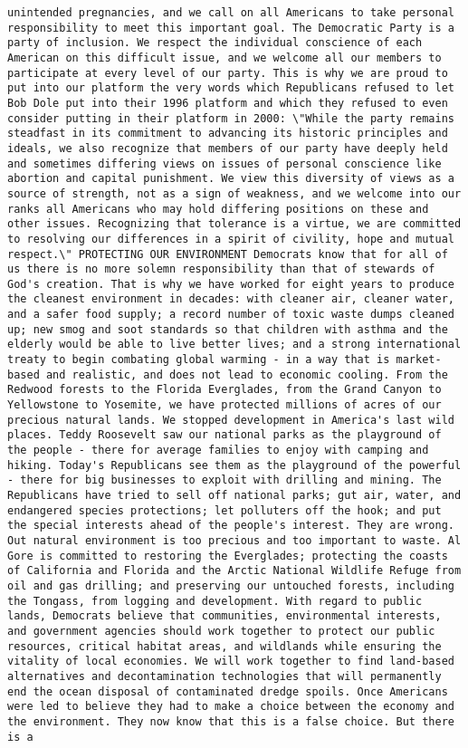 \documentclass[
]{article}
\begin{document}
\begin{verbatim}
unintended pregnancies, and we call on all Americans to take personal responsibility to meet this important goal. The Democratic Party is a party of inclusion. We respect the individual conscience of each American on this difficult issue, and we welcome all our members to participate at every level of our party. This is why we are proud to put into our platform the very words which Republicans refused to let Bob Dole put into their 1996 platform and which they refused to even consider putting in their platform in 2000: \"While the party remains steadfast in its commitment to advancing its historic principles and ideals, we also recognize that members of our party have deeply held and sometimes differing views on issues of personal conscience like abortion and capital punishment. We view this diversity of views as a source of strength, not as a sign of weakness, and we welcome into our ranks all Americans who may hold differing positions on these and other issues. Recognizing that tolerance is a virtue, we are committed to resolving our differences in a spirit of civility, hope and mutual respect.\" PROTECTING OUR ENVIRONMENT Democrats know that for all of us there is no more solemn responsibility than that of stewards of God's creation. That is why we have worked for eight years to produce the cleanest environment in decades: with cleaner air, cleaner water, and a safer food supply; a record number of toxic waste dumps cleaned up; new smog and soot standards so that children with asthma and the elderly would be able to live better lives; and a strong international treaty to begin combating global warming - in a way that is market-based and realistic, and does not lead to economic cooling. From the Redwood forests to the Florida Everglades, from the Grand Canyon to Yellowstone to Yosemite, we have protected millions of acres of our precious natural lands. We stopped development in America's last wild places. Teddy Roosevelt saw our national parks as the playground of the people - there for average families to enjoy with camping and hiking. Today's Republicans see them as the playground of the powerful - there for big businesses to exploit with drilling and mining. The Republicans have tried to sell off national parks; gut air, water, and endangered species protections; let polluters off the hook; and put the special interests ahead of the people's interest. They are wrong. Out natural environment is too precious and too important to waste. Al Gore is committed to restoring the Everglades; protecting the coasts of California and Florida and the Arctic National Wildlife Refuge from oil and gas drilling; and preserving our untouched forests, including the Tongass, from logging and development. With regard to public lands, Democrats believe that communities, environmental interests, and government agencies should work together to protect our public resources, critical habitat areas, and wildlands while ensuring the vitality of local economies. We will work together to find land-based alternatives and decontamination technologies that will permanently end the ocean disposal of contaminated dredge spoils. Once Americans were led to believe they had to make a choice between the economy and the environment. They now know that this is a false choice. But there is a 
\end{verbatim}
\end{document}

